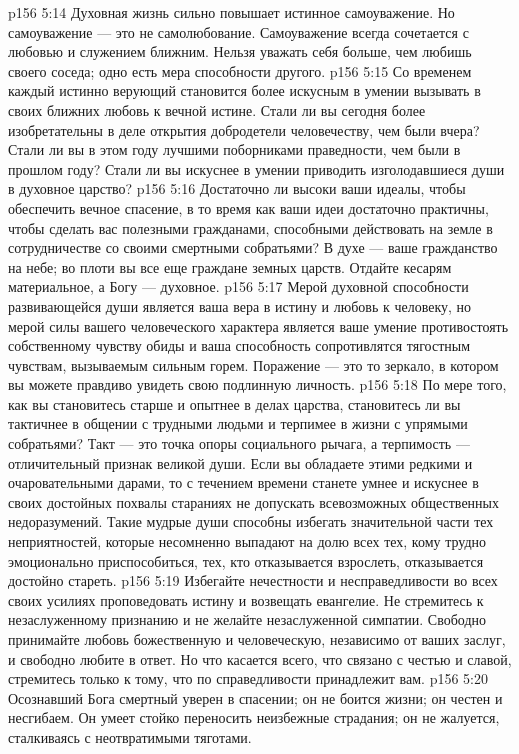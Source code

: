 \vs p156 5:14 Духовная жизнь сильно повышает истинное самоуважение. Но самоуважение --- это не самолюбование. Самоуважение всегда сочетается с любовью и служением ближним. Нельзя уважать себя больше, чем любишь своего соседа; одно есть мера способности другого.
\vs p156 5:15 Со временем каждый истинно верующий становится более искусным в умении вызывать в своих ближних любовь к вечной истине. Стали ли вы сегодня более изобретательны в деле открытия добродетели человечеству, чем были вчера? Стали ли вы в этом году лучшими поборниками праведности, чем были в прошлом году? Стали ли вы искуснее в умении приводить изголодавшиеся души в духовное царство?
\vs p156 5:16 Достаточно ли высоки ваши идеалы, чтобы обеспечить вечное спасение, в то время как ваши идеи достаточно практичны, чтобы сделать вас полезными гражданами, способными действовать на земле в сотрудничестве со своими смертными собратьями? В духе --- ваше гражданство на небе; во плоти вы все еще граждане земных царств. Отдайте кесарям материальное, а Богу --- духовное.
\vs p156 5:17 Мерой духовной способности развивающейся души является ваша вера в истину и любовь к человеку, но мерой силы вашего человеческого характера является ваше умение противостоять собственному чувству обиды и ваша способность сопротивлятся тягостным чувствам, вызываемым сильным горем. Поражение --- это то зеркало, в котором вы можете правдиво увидеть свою подлинную личность.
\vs p156 5:18 По мере того, как вы становитесь старше и опытнее в делах царства, становитесь ли вы тактичнее в общении с трудными людьми и терпимее в жизни с упрямыми собратьями? Такт --- это точка опоры социального рычага, а терпимость --- отличительный признак великой души. Если вы обладаете этими редкими и очаровательными дарами, то с течением времени станете умнее и искуснее в своих достойных похвалы стараниях не допускать всевозможных общественных недоразумений. Такие мудрые души способны избегать значительной части тех неприятностей, которые несомненно выпадают на долю всех тех, кому трудно эмоционально приспособиться, тех, кто отказывается взрослеть, отказывается достойно стареть.
\vs p156 5:19 Избегайте нечестности и несправедливости во всех своих усилиях проповедовать истину и возвещать евангелие. Не стремитесь к незаслуженному признанию и не желайте незаслуженной симпатии. Свободно принимайте любовь божественную и человеческую, независимо от ваших заслуг, и свободно любите в ответ. Но что касается всего, что связано с честью и славой, стремитесь только к тому, что по справедливости принадлежит вам.
\vs p156 5:20 Осознавший Бога смертный уверен в спасении; он не боится жизни; он честен и несгибаем. Он умеет стойко переносить неизбежные страдания; он не жалуется, сталкиваясь с неотвратимыми тяготами.
